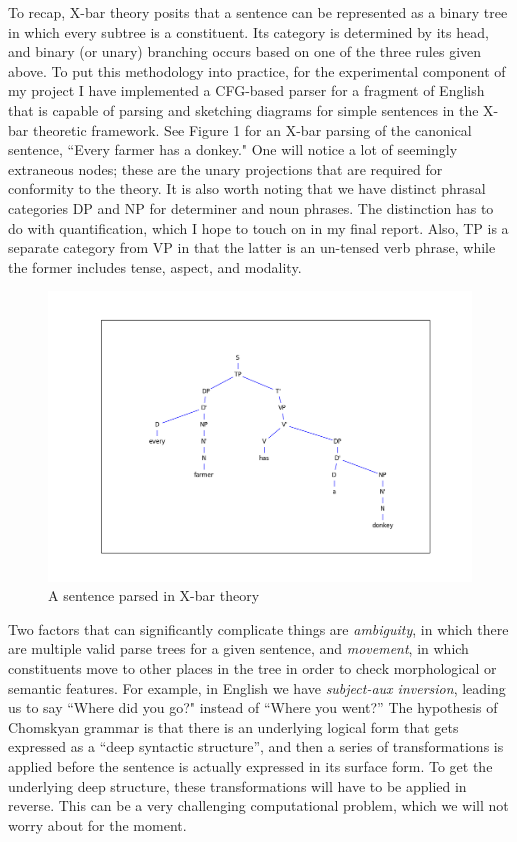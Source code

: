 \documentclass[11pt, oneside]{article}      %
\begin{document}
To recap, X-bar theory posits that a sentence can be represented as a binary tree in which every subtree is a constituent.  Its category is determined by its head, and binary (or unary) branching occurs based on one of the three rules given above.  To put this methodology into practice, for the experimental component of my project I have implemented a CFG-based parser for a fragment of English that is capable of parsing and sketching diagrams for simple sentences in the X-bar theoretic framework.  See Figure 1 for an X-bar parsing of the canonical sentence, ``Every farmer has a donkey."  One will notice a lot of seemingly extraneous nodes; these are the unary projections that are required for conformity to the theory.  It is also worth noting that we have distinct phrasal categories DP and NP for determiner and noun phrases.  The distinction has to do with quantification, which I hope to touch on in my final report.  Also, TP is a separate category from VP in that the latter is an un-tensed verb phrase, while the former includes tense, aspect, and modality.

\begin{figure}[h] \label{fig_sent1}
\caption{A sentence parsed in X-bar theory}
\centerline{\includegraphics[scale=.6]{sent1.png}}
\end{figure}

Two factors that can significantly complicate things are \textit{ambiguity}, in which there are multiple valid parse trees for a given sentence, and \textit{movement}, in which constituents move to other places in the tree in order to check morphological or semantic features.  For example, in English we have \textit{subject-aux inversion}, leading us to say ``Where did you go?" instead of ``Where you went?''  The hypothesis of Chomskyan grammar is that there is an underlying logical form that gets expressed as a ``deep syntactic structure'', and then a series of transformations is applied before the sentence is actually expressed in its surface form.  To get the underlying deep structure, these transformations will have to be applied in reverse.  This can be a very challenging computational problem, which we will not worry about for the moment.
\end{document}
